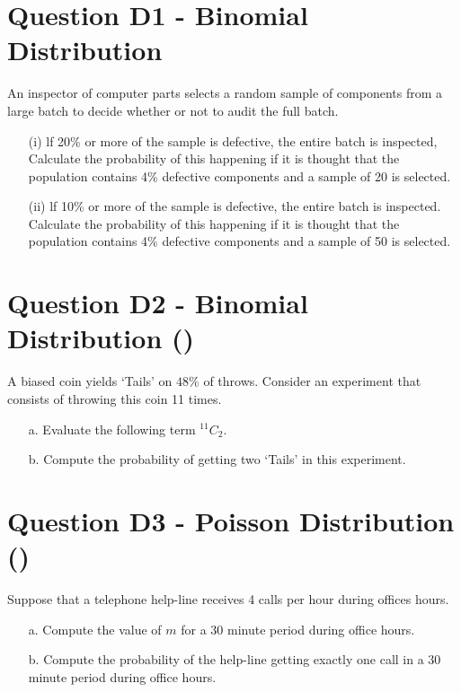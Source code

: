 
\section{Question D1 - Binomial Distribution } %
An inspector of computer parts selects a random sample of components
from a large batch to decide whether or not to audit the full batch.

\begin{itemize}

\item[(i)] lf 20\% or more of the sample is defective, the entire batch is
inspected, Calculate the probability of this happening if it is
thought that the population contains 4\% defective components and
a sample of 20 is selected.

\item[(ii)] lf 10\% or more of the sample is defective, the entire batch is
inspected. Calculate the probability of this happening if it is
thought that the population contains 4\% defective components and
a sample of 50 is selected.

\end{itemize}

\section{Question D2 - Binomial Distribution () } %
A biased coin yields `Tails' on $48\%$ of throws. Consider an experiment that consists of throwing this coin 11 times.
\begin{itemize}

\item[a.]  Evaluate the following term $^{11}C_2$.

\item[b.]  Compute the probability of getting two `Tails' in this experiment.
\end{itemize}
\section{Question D3 -  Poisson Distribution () }  %
Suppose that a telephone help-line receives 4 calls per hour during offices hours.
\begin{itemize}

\item[a.]  Compute the value of $m$ for a 30 minute period during office hours.

\item[b.]  Compute the probability of the help-line getting exactly one call in a 30 minute period during office hours.
\end{itemize}

